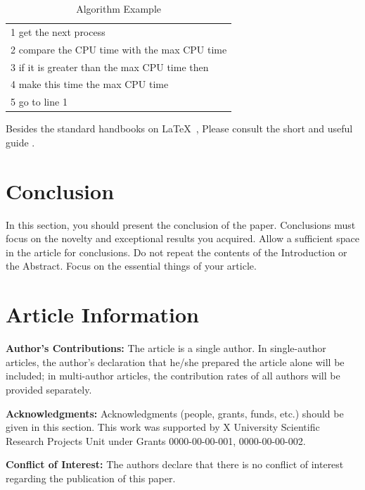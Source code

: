 \documentclass[final, 9pt, onecolumn]{saucis}
\begin{document}
\begin{table}[p]
\centering
\caption{Algorithm Example}
\label{alg:example}
\begin{tabular}{p{}}
\hline
1 \quad get the next process\\
2 \quad compare the CPU time with the max CPU time\\
3 \quad if it is greater than the max CPU time then\\
4 \qquad make this time the max CPU time\\
5 \quad go to line 1\\
\hline
\end{tabular}
\end{table}

Besides the standard handbooks on \LaTeX\  \cite{gre, koc, lop},
Please consult the short and useful guide \cite{TrzD}.

\section{Conclusion}

In this section, you should present the conclusion of the paper. Conclusions must focus on the novelty and exceptional results you acquired. Allow a sufficient space in the article for conclusions. Do not repeat the contents of the Introduction or the Abstract. Focus on the essential things of your article.

\section*{Article Information}
\vspace{0.2cm}

\textbf{Author's Contributions:}
The article is a single author. In single-author articles, the author's declaration that he/she prepared the article alone will be included; in multi-author articles, the contribution rates of all authors will be provided separately.\vspace{0.2cm}

\textbf{Acknowledgments:}
Acknowledgments (people, grants, funds, etc.) should be given in this section.
This work was supported by X University Scientific Research Projects Unit under Grants 0000-00-00-001, 0000-00-00-002.\vspace{0.2cm}


\textbf{Conflict of Interest:}
The authors declare that there is no conflict of interest regarding the publication of this paper. \vspace{0.2cm}
\end{document}
